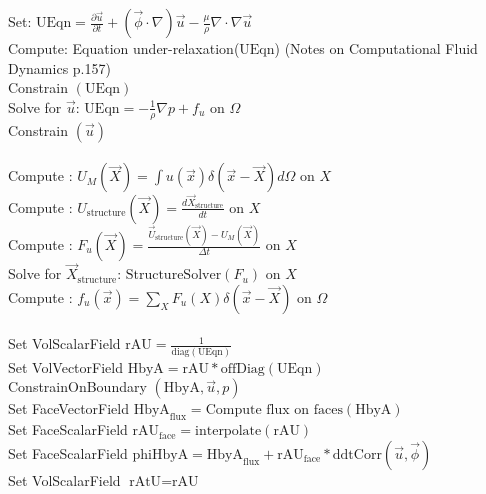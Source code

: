 \documentclass[10pt]{article} %
\begin{document}
\begin{algorithm}[H]
	\SetAlgoLined
	{
		{
			Set: $\text{UEqn} = \frac{\partial \vec{u}}{\partial t} + (\vec{\phi} \cdot \nabla) \vec{u} - \frac{\mu}{\rho} \nabla \cdot \nabla \vec{u}$\\
			Compute: Equation under-relaxation($\text{UEqn}$) (Notes on Computational Fluid Dynamics p.157)\\
			Constrain $(\text{UEqn})$\\
			Solve for $\vec{u}$: $\text{UEqn} = - \frac{1}{\rho} \nabla p + f_u$ \quad on $\Omega$\\
			Constrain $(\vec{u})$\\
			\quad \\
			Compute : $U_M (\vec{X}) = \int u(\vec{x}) \delta(\vec{x}-\vec{X}) d \Omega$ \quad on $X$\\
			Compute : $U_{\text{structure}} (\vec{X}) = \frac{d \vec{X}_{\text{structure}}}{dt}$ \quad on $X$\\
			Compute : $F_u (\vec{X}) = \frac{\vec{U}_\text{structure} (\vec{X}) - U_M(\vec{X})}{\Delta t}$ \quad on $X$\\
			Solve for $\vec{X}_\text{structure}$: $\text{StructureSolver}(F_u)$ \quad on $X$\\
			Compute : $f_u (\vec{x}) = \sum_{X} F_u (X) \delta (\vec{x}-\vec{X})$ \quad on $\Omega$\\
			\quad \\
			{
				Set VolScalarField $\text{rAU} =  \frac{1}{\text{diag}(\text{UEqn})}$\\
				Set VolVectorField $\text{HbyA} =  \text{rAU}*\text{offDiag}(\text{UEqn})$\\
				ConstrainOnBoundary $(\text{HbyA},\vec{u},p)$\\
				\quad Set FaceVectorField $\text{HbyA}_{\text{flux}} =  \text{Compute flux on faces}(\text{HbyA})$\\
				\quad Set FaceScalarField $\text{rAU}_{\text{face}} =  \text{interpolate}(\text{rAU})$\\
				Set FaceScalarField $\text{phiHbyA} = \text{HbyA}_{\text{flux}} + \text{rAU}_{\text{face}}*\text{ddtCorr}(\vec{u},\vec{\phi}) $\\
				Set VolScalarField $\text{rAtU} = \text{rAU}$\\
}}}
\end{algorithm}
\end{document}
